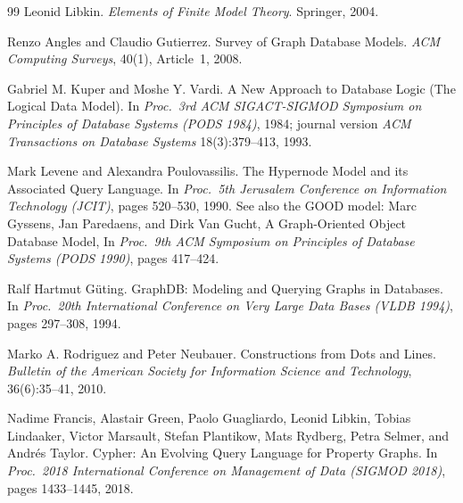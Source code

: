 \documentclass[11pt,letterpaper]{article}
\theoremstyle{definition}
\begin{document}
\begin{thebibliography}{99}
Leonid Libkin. \emph{Elements of Finite Model Theory}. Springer, 2004.

Renzo Angles and Claudio Gutierrez. Survey of Graph Database Models. \emph{ACM Computing Surveys}, 40(1), Article~1, 2008.

Gabriel M. Kuper and Moshe Y. Vardi. A New Approach to Database Logic (The Logical Data Model). In \emph{Proc.\ 3rd ACM SIGACT-SIGMOD Symposium on Principles of Database Systems (PODS 1984)}, 1984; journal version \emph{ACM Transactions on Database Systems} 18(3):379--413, 1993.

Mark Levene and Alexandra Poulovassilis. The Hypernode Model and its Associated Query Language. In \emph{Proc.\ 5th Jerusalem Conference on Information Technology (JCIT)}, pages 520--530, 1990. See also the GOOD model: Marc Gyssens, Jan Paredaens, and Dirk Van Gucht, A Graph-Oriented Object Database Model, In \emph{Proc.\ 9th ACM Symposium on Principles of Database Systems (PODS 1990)}, pages 417--424.

Ralf Hartmut G\"uting. GraphDB: Modeling and Querying Graphs in Databases. In \emph{Proc.\ 20th International Conference on Very Large Data Bases (VLDB 1994)}, pages 297--308, 1994.

Marko A. Rodriguez and Peter Neubauer. Constructions from Dots and Lines. \emph{Bulletin of the American Society for Information Science and Technology}, 36(6):35--41, 2010.

Nadime Francis, Alastair Green, Paolo Guagliardo, Leonid Libkin, Tobias Lindaaker, Victor Marsault, Stefan Plantikow, Mats Rydberg, Petra Selmer, and Andr\'es Taylor. Cypher: An Evolving Query Language for Property Graphs. In \emph{Proc.\ 2018 International Conference on Management of Data (SIGMOD 2018)}, pages 1433--1445, 2018.

\end{thebibliography}
\end{document}
